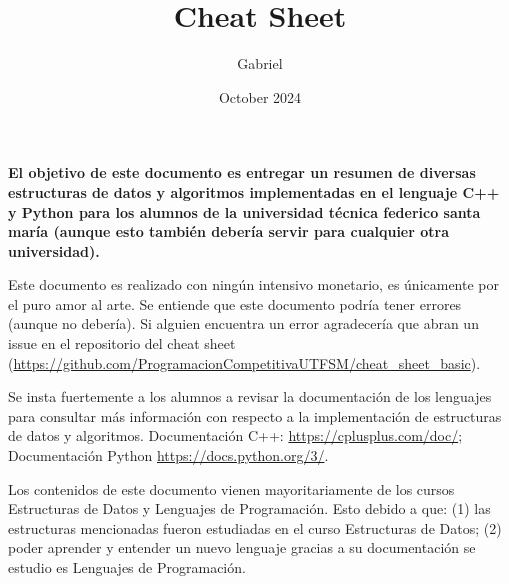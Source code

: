 \documentclass{article}
\title{\footnotesize Cheat Sheet}
\author{\footnotesize Gabriel }
\date{\footnotesize October 2024}
\begin{document}
\scriptsize
\maketitle

{
  \bf El objetivo de este documento es entregar un resumen de diversas estructuras de datos y algoritmos implementadas en el lenguaje C++ y Python para los alumnos de la universidad técnica federico santa maría (aunque esto también debería servir para cualquier otra universidad).

  Este documento es realizado con ningún intensivo monetario, es únicamente por el puro amor al arte. Se entiende que este documento podría tener errores (aunque no debería). Si alguien encuentra un error agradecería que abran un issue en el repositorio del cheat sheet (\href{https://github.com/ProgramacionCompetitivaUTFSM/cheat_sheet_basic}{https://github.com/ProgramacionCompetitivaUTFSM/cheat\_sheet\_basic}).

  Se insta fuertemente a los alumnos a revisar la documentación de los lenguajes para consultar más información con respecto a la implementación de estructuras de datos y algoritmos. Documentación C++: \href{https://cplusplus.com/doc/}{https://cplusplus.com/doc/}; Documentación Python \href{https://docs.python.org/3/}{https://docs.python.org/3/}.

  Los contenidos de este documento vienen mayoritariamente de los cursos Estructuras de Datos y Lenguajes de Programación. Esto debido a que: (1) las estructuras mencionadas fueron estudiadas en el curso Estructuras de Datos; (2) poder aprender y entender un nuevo lenguaje gracias a su documentación se estudio es Lenguajes de Programación.
}
\end{document}
